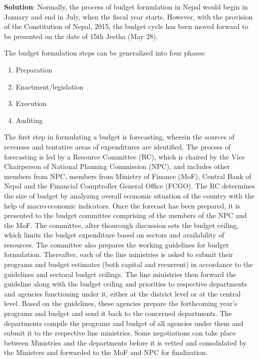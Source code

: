\documentclass[
]{book}
\newenvironment{solution}{ {\bfseries Solution}:}{}
\begin{document}
\begin{questions}
\begin{solution}
Normally, the process of budget formulation in Nepal would begin in January and end in July, when the fiscal year starts. However, with the provision of the Constitution of Nepal, 2015, the budget cycle has been moved forward to be presented on the date of 15th Jestha (May 28).

The budget formulation steps can be generalized into four phases:
\begin{enumerate}
\item Preparation
\item Enactment/legislation
\item Execution
\item Auditing
\end{enumerate}

The first step in formulating a budget is forecasting, wherein the sources of revenues and tentative areas of expenditures are identified. The process of forecasting is led by a Resource Committee (RC), which is chaired by the Vice Chairperson of National Planning Commission (NPC), and includes other members from NPC, members from Ministry of Finance (MoF), Central Bank of Nepal and the Financial Comptroller General Office (FCGO). The RC determines the size of budget by analyzing overall economic situation of the country with the help of macro-economic indicators. Once the forecast has been prepared, it is presented to the budget committee comprising of the members of the NPC and the MoF. The committee, after thourough discussion sets the budget ceiling, which limits the budget expenditure based on sectors and availability of resources. The committee also prepares the working guidelines for budget formulation. Thereafter, each of the line ministries is asked to submit their programs and budget estimates (both capital and recurrent) in accordance to the guidelines and sectoral budget ceilings. The line ministries then forward the guideline along with the budget ceiling and priorities to respective departments and agencies functioning under it, either at the district level or at the central level. Based on the guidelines, these agencies prepare the forthcoming year's programs and budget and send it back to the concerned departments. The departments compile the programs and budget of all agencies under them and submit it to the respective line ministries. Some negotiations can take place between Ministries and the departments before it is vetted and consolidated by the Ministers and forwarded to the MoF and NPC for finalization.


\end{solution}
\end{questions}
\end{document}
